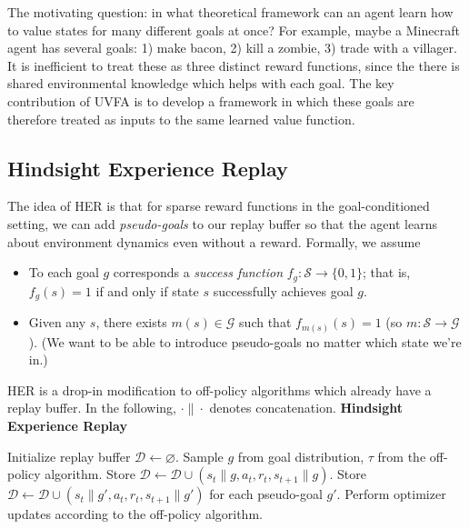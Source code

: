 \documentclass[11pt, letterpaper]{article}
\begin{document}
\begin{remark}
    The motivating question: in what theoretical framework can an agent learn how to value states for many different goals at once? For example, maybe a Minecraft agent has several goals: 1) make bacon, 2) kill a zombie, 3) trade with a villager. It is inefficient to treat these as three distinct reward functions, since the there is shared environmental knowledge which helps with each goal. The key contribution of UVFA is to develop a framework in which these goals are therefore treated as inputs to the same learned value function. 
\end{remark}

\subsection{Hindsight Experience Replay} 

\begin{concept}
    The idea of HER is that for sparse reward functions in the goal-conditioned setting, we can add \textit{pseudo-goals} to our replay buffer so that the agent learns about environment dynamics even without a reward. Formally, we assume 
    \begin{itemize}
        \item To each goal \(g\) corresponds a \textit{success function} \(f_g : \mathcal{S} \to \{0, 1\}\); that is, \(f_g(s) = 1\) if and only if state \(s\) successfully achieves goal \(g\). 
        \item Given any \(s\), there exists \(m(s) \in \mathcal{G}\) such that \(f_{m(s)}(s) = 1\) (so \(m : \mathcal{S} \to \mathcal{G}\)). (We want to be able to introduce pseudo-goals no matter which state we're in.)
    \end{itemize}
    HER is a drop-in modification to off-policy algorithms which already have a replay buffer. In the following, \(\cdot\|\cdot\) denotes concatenation. 
    \algline
    \textbf{Hindsight Experience Replay}
    \begin{algorithmic}[1]
        \State Initialize replay buffer \(\mathcal{D} \gets \varnothing\). 
            \State Sample \(g\) from goal distribution, \(\tau\) from the off-policy algorithm. 
                \State Store \(\mathcal{D} \gets \mathcal{D} \cup (s_t \| g, a_t, r_t, s_{t+1}\|g)\). 
                \State Store \(\mathcal{D} \gets \mathcal{D} \cup (s_t \| g', a_t, r_t, s_{t+1}\|g')\) for each pseudo-goal \(g'\). 
            \EndFor
            \State Perform optimizer updates according to the off-policy algorithm. 
        \EndFor
    \end{algorithmic}
    \algline
\end{concept}
\end{document}
